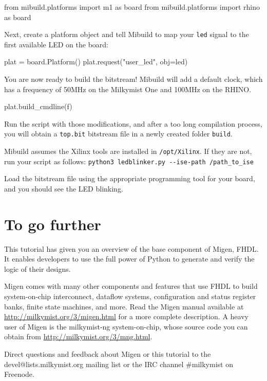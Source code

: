 \documentclass[11pt]{paper}
\begin{document}
\begin{verbatimtab}
from mibuild.platforms import m1 as board
from mibuild.platforms import rhino as board
\end{verbatimtab}


Next, create a platform object and tell Mibuild to map your \verb!led! signal to the first available LED on the board:
\begin{verbatimtab}
plat = board.Platform()
plat.request("user_led", obj=led)
\end{verbatimtab}

You are now ready to build the bitstream! Mibuild will add a default clock, which has a frequency of 50MHz on the Milkymist One and 100MHz on the RHINO.
\begin{verbatimtab}
plat.build_cmdline(f)
\end{verbatimtab}

Run the script with those modifications, and after a too long compilation process, you will obtain a \verb!top.bit! bitstream file in a newly created folder \verb!build!.

Mibuild assumes the Xilinx tools are installed in \verb!/opt/Xilinx!. If they are not, run your script as follows: \verb!python3 ledblinker.py --ise-path /path_to_ise!

Load the bitstream file using the appropriate programming tool for your board, and you should see the LED blinking.

\section{To go further}
This tutorial has given you an overview of the base component of Migen, FHDL. It enables developers to use the full power of Python to generate and verify the logic of their designs.

Migen comes with many other components and features that use FHDL to build system-on-chip interconnect, dataflow systems, configuration and status register banks, finite state machines, and more. Read the Migen manual available at \url{http://milkymist.org/3/migen.html} for a more complete description. A heavy user of Migen is the milkymist-ng system-on-chip, whose source code you can obtain from \url{http://milkymist.org/3/mng.html}.

Direct questions and feedback about Migen or this tutorial to the devel@lists.milkymist.org mailing list or the IRC channel \#milkymist on Freenode.
\end{document}
